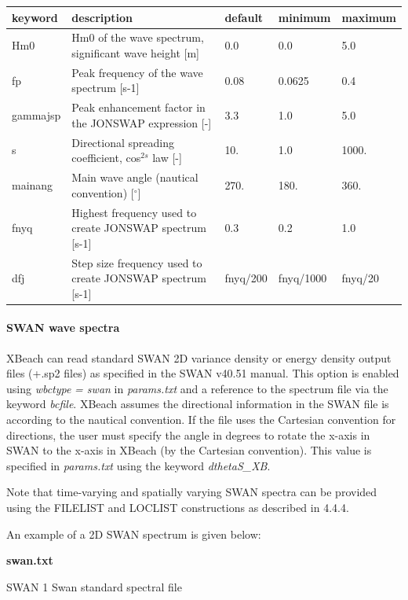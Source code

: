 \documentclass{article}
\begin{document}
\begin{tabular}{|p{0.6in}|p{1.7in}|p{0.6in}|p{0.6in}|p{0.6in}|} \hline 
keyword & description & default & minimum & maximum \\ \hline 
Hm0 & Hm0 of the wave spectrum, significant wave height [m] & 0.0 & 0.0 & 5.0 \\ \hline 
fp & Peak frequency of the wave spectrum [s-1] & 0.08 & 0.0625 & 0.4 \\ \hline 
gammajsp & Peak enhancement factor in the JONSWAP expression [-] & 3.3 & 1.0 & 5.0 \\ \hline 
s & Directional spreading coefficient, cos${}^{2s}$ law [-] & 10. & 1.0 & 1000. \\ \hline 
mainang & Main wave angle (nautical convention) [${}^\circ$] & 270. & 180. & 360. \\ \hline 
fnyq & Highest frequency used to create JONSWAP spectrum [s-1] & 0.3 & 0.2 & 1.0 \\ \hline 
dfj & Step size frequency used to create JONSWAP spectrum [s-1] & fnyq/200 & fnyq/1000 & fnyq/20 \\ \hline 
\end{tabular}


\paragraph{ SWAN wave spectra}

\noindent XBeach can read standard SWAN 2D variance density or energy density output files (+.sp2 files) as specified in the SWAN v40.51 manual. This option is enabled using \textit{wbctype} \textit{= swan} in \textit{params.txt }and a reference to the spectrum file via the keyword \textit{bcfile}. XBeach assumes the directional information in the SWAN file is according to the nautical convention. If the file uses the Cartesian convention for directions, the user must specify the angle in degrees to rotate the x-axis in SWAN to the x-axis in XBeach (by the Cartesian convention). This value is specified in \textit{params.txt} using the keyword \textit{dthetaS\_XB}.

\noindent Note that time-varying and spatially varying SWAN spectra can be provided using the FILELIST and LOCLIST constructions as described in 4.4.4.

\noindent An example of a 2D SWAN spectrum is given below:

\noindent \textbf{swan.txt}

\noindent SWAN   1                                Swan standard spectral file
\end{document}
